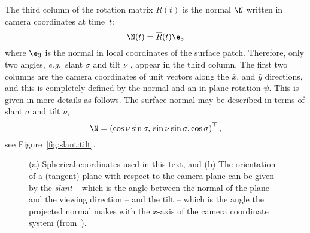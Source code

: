 The third column of the rotation matrix $\overline R(t)$ is the normal $\N$ written
in camera coordinates at time~$t$:
\begin{equation}
\N(t) = \overline R(t)\e_3
\end{equation}
where $\e_3$ is the normal in local coordinates of the surface patch. Therefore,
only two angles, \emph{e.g.}\ slant $\sigma$%
%
%
and tilt $\nu$%
%
%
, appear in the third
column. The first two columns are the camera coordinates of unit vectors along the
$\bar x$, and $\bar y$ directions, and this is completely defined by the normal
and an in-plane rotation $\psi$. This is given in more details as follows.
The surface normal may be described in terms of slant
$\sigma$ and tilt $\nu$, 
\begin{equation}\label{eq:BB:N:slant:tilt}
\N = \left( \cos\nu\sin\sigma,\,\sin\nu\sin\sigma,\cos\sigma \right)^\top,
\end{equation}
see Figure~\ref{fig:slant:tilt}. 

\begin{figure}
\centering
\caption{%
(a) Spherical coordinates used in this text, and (b) The
orientation of a (tangent) plane with respect to the camera plane can be given
by the \emph{slant} -- which is the angle between the normal of the plane and
the viewing direction -- and the tilt -- which is the angle the projected normal
makes with the $x$-axis of the camera coordinate system (from~\cite{Forsyth:Ponce:Book}).
}
\end{figure}

